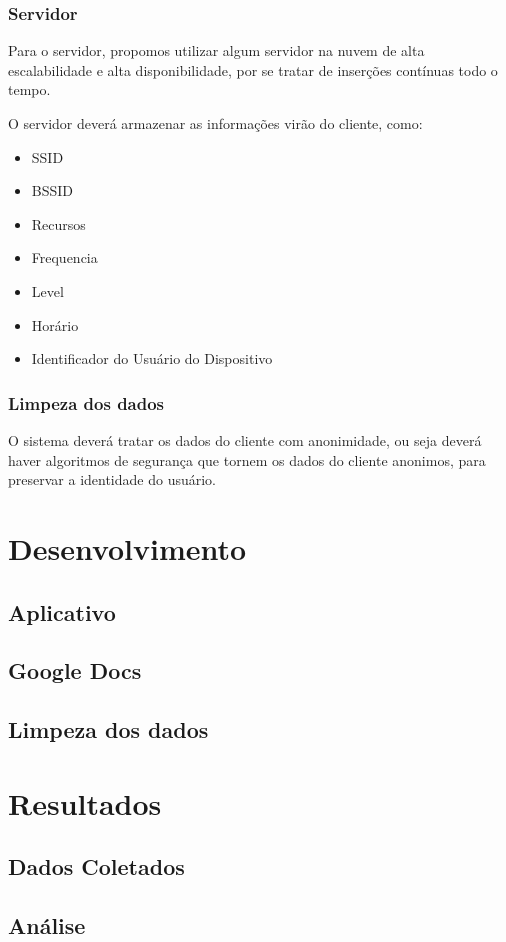 \documentclass[12pt, %
openright, 
oneside,
a4paper,
brazil]{facom-ufu-abntex2}
\begin{document}
\subsection{Servidor}
Para o servidor, propomos utilizar algum servidor na nuvem de alta escalabilidade e alta disponibilidade, por se tratar de inserções contínuas todo o tempo.

O servidor deverá armazenar as informações virão do cliente, como:
\begin{itemize}
  \item SSID
  \item BSSID
  \item Recursos
  \item Frequencia
  \item Level
  \item Horário
  \item Identificador do Usuário do Dispositivo
  \end{itemize}
  
\subsection{Limpeza dos dados}
O sistema deverá tratar os dados do cliente com anonimidade, ou seja deverá haver algoritmos de segurança que tornem os dados do cliente anonimos, para preservar a identidade do usuário.
\chapter{Desenvolvimento}
\section{Aplicativo}
\section{Google Docs}
\section{Limpeza dos dados}

\chapter{Resultados}
\section{Dados Coletados}
\section{Análise}
\end{document}
